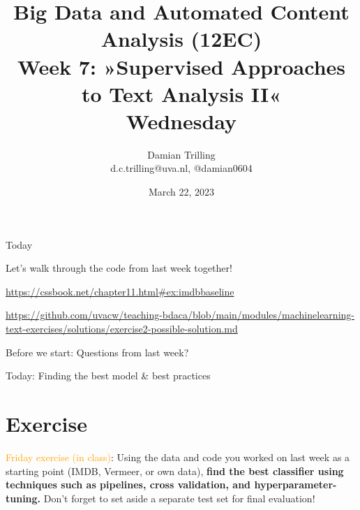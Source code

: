 

\graphicspath{{../../resources/img/}}




\title[Big Data and Automated Content Analysis]{\textbf{Big Data and Automated Content Analysis (12EC)} 
\\Week 7: »Supervised Approaches to Text Analysis II«
\\Wednesday}
\author[Damian Trilling]{Damian Trilling\\ \footnotesize{d.c.trilling@uva.nl, @damian0604 \\}}
\date{March 22, 2023}


\begin{frame}{}
	\titlepage
\end{frame}

\begin{frame}{Today}
	\tableofcontents
\end{frame}


\begin{frame}[standout]
Let's walk through the code from last week together!

\url{https://cssbook.net/chapter11.html\#ex:imdbbaseline}

\url{https://github.com/uvacw/teaching-bdaca/blob/main/modules/machinelearning-text-exercises/solutions/exercise2-possible-solution.md}


\end{frame}



\begin{frame}[standout]
Before we start: Questions from last week?
\end{frame}


\begin{frame}[standout]
Today: Finding the best model \& best practices
\end{frame}









\section{Exercise}


\begin{frame}[standout]
\textcolor{orange}{Friday exercise (in class)}: Using the data and code you worked on last week as a starting point (IMDB, Vermeer, or own data), \textbf{find the best classifier using techniques such as pipelines, cross validation, and hyperparameter-tuning.} Don't forget to set aside a separate test set for final evaluation!
\end{frame}





\begin{frame}
	\printbibliography
\end{frame}




